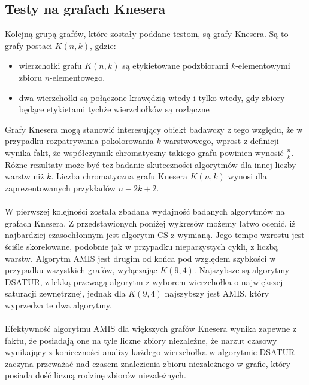 \documentclass[10pt,a4paper]{article}
\begin{document}
	\subsection{Testy na grafach Knesera}
	
	Kolejną grupą grafów, które zostały poddane testom, są grafy Knesera. Są to grafy postaci $K(n, k)$, gdzie:
	\begin{itemize}
		\item wierzchołki grafu $K(n, k)$ są etykietowane podzbiorami $k$-elementowymi zbioru $n$-elementowego.
		\item dwa wierzchołki są połączone krawędzią wtedy i tylko wtedy, gdy zbiory będące etykietami tychże wierzchołków są rozłączne
	\end{itemize}

	Grafy Knesera mogą stanowić interesujący obiekt badawczy z tego względu, że w przypadku rozpatrywania pokolorowania $k$-warstwowego, wprost z definicji wynika fakt, że współczynnik chromatyczny takiego grafu powinien wynosić $\frac{n}{k}$. Różne rezultaty może być też badanie skuteczności algorytmów dla innej liczby warstw niż $k$. Liczba chromatyczna grafu Knesera $K(n,k)$ wynosi dla zaprezentowanych przykładów $n - 2k + 2$.
	\\~\\
	W pierwszej kolejności została zbadana wydajność badanych algorytmów na grafach Knesera. Z przedstawionych poniżej wykresów możemy łatwo ocenić, iż najbardziej czasochłonnym jest algorytm CS z wymianą. Jego tempo wzrostu jest ściśle skorelowane, podobnie jak w przypadku nieparzystych cykli, z liczbą warstw. Algorytm AMIS jest drugim od końca pod względem szybkości w przypadku wszystkich grafów, wyłączając $K(9, 4)$. Najszybsze są algorytmy DSATUR, z lekką przewagą algorytm z wyborem wierzchołka o największej saturacji zewnętrznej, jednak dla $K(9, 4)$ najszybszy jest AMIS, który wyprzedza te dwa algorytmy. 
	\\~\\
	Efektywność algorytmu AMIS dla większych grafów Knesera wynika zapewne z faktu, że posiadają one na tyle liczne zbiory niezależne, że narzut czasowy wynikający z konieczności analizy każdego wierzchołka w algorytmie DSATUR zaczyna przeważać nad czasem znalezienia zbioru niezależnego w grafie, który posiada dość liczną rodzinę zbiorów niezależnych. 
	
	\pagebreak
	
\end{document}
